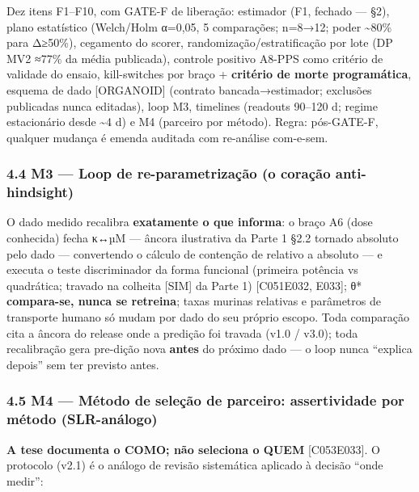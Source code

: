 \documentclass[
  10pt,
]{article}
\begin{document}
Dez itens F1--F10, com GATE-F de liberação: estimador (F1, fechado ---
§2), plano estatístico (Welch/Holm α=0,05, 5 comparações; n=8→12; poder
\textasciitilde80\% para Δ≥50\%), cegamento do scorer,
randomização/estratificação por lote (DP MV2 ≈77\% da média publicada),
controle positivo A8-PPS como critério de validade do ensaio,
kill-switches por braço + \textbf{critério de morte programática},
esquema de dado {[}ORGANOID{]} (contrato bancada→estimador; exclusões
publicadas nunca editadas), loop M3, timelines (readouts 90--120 d;
regime estacionário desde \textasciitilde4 d) e M4 (parceiro por
método). Regra: pós-GATE-F, qualquer mudança é emenda auditada com
re-análise com-e-sem.

\hypertarget{m3-loop-de-re-parametrizauxe7uxe3o-o-corauxe7uxe3o-anti-hindsight}{%
\subsubsection{4.4 M3 --- Loop de re-parametrização (o coração
anti-hindsight)}\label{m3-loop-de-re-parametrizauxe7uxe3o-o-corauxe7uxe3o-anti-hindsight}}

O dado medido recalibra \textbf{exatamente o que informa}: o braço A6
(dose conhecida) fecha κ↔µM --- âncora ilustrativa da Parte 1 §2.2
tornado absoluto pelo dado --- convertendo o cálculo de contenção de
relativo a absoluto --- e executa o teste discriminador da forma
funcional (primeira potência vs quadrática; travado na colheita
{[}SIM{]} da Parte 1) {[}C051\textbar E032, E033{]}; θ*
\textbf{compara-se, nunca se retreina}; taxas murinas relativas e
parâmetros de transporte humano só mudam por dado do seu próprio escopo.
Toda comparação cita a âncora do release onde a predição foi travada
(v1.0 / v3.0); toda recalibração gera pre-dição nova \textbf{antes} do
próximo dado --- o loop nunca ``explica depois'' sem ter previsto antes.

\hypertarget{m4-muxe9todo-de-seleuxe7uxe3o-de-parceiro-assertividade-por-muxe9todo-slr-anuxe1logo}{%
\subsubsection{4.5 M4 --- Método de seleção de parceiro: assertividade
por método
(SLR-análogo)}\label{m4-muxe9todo-de-seleuxe7uxe3o-de-parceiro-assertividade-por-muxe9todo-slr-anuxe1logo}}

\textbf{A tese documenta o COMO; não seleciona o QUEM}
{[}C053\textbar E033{]}. O protocolo (v2.1) é o análogo de revisão
sistemática aplicado à decisão ``onde medir'':
\end{document}
